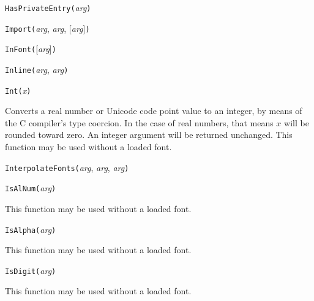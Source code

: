 \texttt{HasPrivateEntry(}\textit{arg}\texttt{)}



\texttt{Import(}\textit{arg}, \textit{arg}, [\textit{arg}]\texttt{)}



\texttt{InFont(}[\textit{arg}]\texttt{)}



\texttt{Inline(}\textit{arg}, \textit{arg}\texttt{)}



\texttt{Int(}\textit{x}\texttt{)}

Converts a real number or Unicode code point value to an integer, by means
of the C compiler's type coercion.  In the case of real numbers, that means
$x$ will be rounded toward zero.  An integer argument will be returned
unchanged.
This function may be used without a loaded font.



\texttt{InterpolateFonts(}\textit{arg}, \textit{arg}, \textit{arg}\texttt{)}



\texttt{IsAlNum(}\textit{arg}\texttt{)}

This function may be used without a loaded font.



\texttt{IsAlpha(}\textit{arg}\texttt{)}

This function may be used without a loaded font.



\texttt{IsDigit(}\textit{arg}\texttt{)}

This function may be used without a loaded font.



